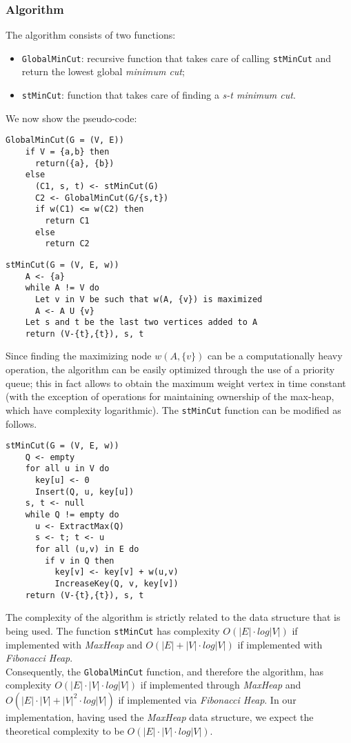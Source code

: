 \subsubsection{Algorithm}
The algorithm consists of two functions:
\begin{itemize}
    \item \verb|GlobalMinCut|: recursive function that takes care of calling \verb|stMinCut| and return the lowest global \textit{minimum cut};
    \item \verb|stMinCut|: function that takes care of finding a \textit{s-t minimum cut}. 
\end{itemize}
\noindent
We now show the pseudo-code:
\begin{verbatim}
GlobalMinCut(G = (V, E))
    if V = {a,b} then
      return({a}, {b})
    else
      (C1, s, t) <- stMinCut(G)
      C2 <- GlobalMinCut(G/{s,t})
      if w(C1) <= w(C2) then
        return C1
      else
        return C2
\end{verbatim}
\begin{verbatim}
stMinCut(G = (V, E, w))
    A <- {a}
    while A != V do
      Let v in V be such that w(A, {v}) is maximized
      A <- A U {v}
    Let s and t be the last two vertices added to A
    return (V-{t},{t}), s, t
\end{verbatim}
\noindent
Since finding the maximizing node \(w(A, \{v\})\) can be a computationally heavy operation, the algorithm can be easily optimized through the use of a priority queue; this in fact allows to obtain the maximum weight vertex in time constant (with the exception of operations for maintaining ownership of the max-heap, which have complexity logarithmic). The \verb|stMinCut| function can be modified as follows.
\begin{verbatim}
stMinCut(G = (V, E, w))
    Q <- empty
    for all u in V do
      key[u] <- 0
      Insert(Q, u, key[u])
    s, t <- null
    while Q != empty do
      u <- ExtractMax(Q)
      s <- t; t <- u
      for all (u,v) in E do
        if v in Q then
          key[v] <- key[v] + w(u,v)
          IncreaseKey(Q, v, key[v])
    return (V-{t},{t}), s, t
\end{verbatim}

\noindent
The complexity of the algorithm is strictly related to the data structure that is being used. The function \verb|stMinCut| has complexity $O(|E|\cdot log|V|)$ if implemented with \textit{MaxHeap} and  $O(|E| + |V| \cdot log|V|)$ if implemented with \textit{Fibonacci Heap}.\\
Consequently, the \verb|GlobalMinCut| function, and therefore the algorithm, has complexity $O(|E| \cdot |V| \cdot log|V|)$ if implemented through \textit {MaxHeap} and $O(|E| \cdot |V| + |V| ^ 2 \cdot log|V|)$ if implemented via \textit {Fibonacci Heap}. In our implementation, having used the \textit{MaxHeap} data structure, we expect the theoretical complexity to be $O(|E| \cdot |V| \cdot log|V|)$.

